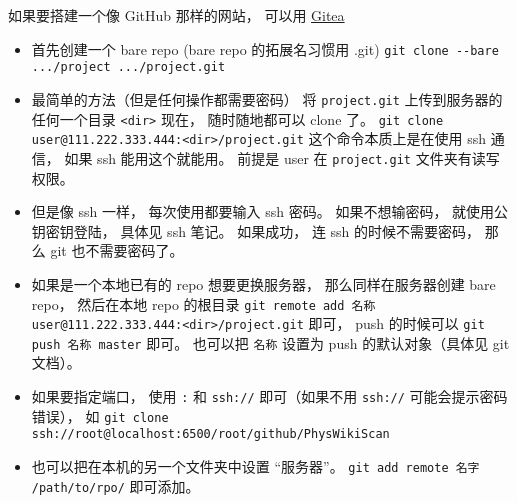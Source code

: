 
\begin{issues}
\issueDraft
\end{issues}


如果要搭建一个像 GitHub 那样的网站， 可以用 \href{https://github.com/go-gitea/gitea}{Gitea}

\begin{itemize}
\item 首先创建一个 bare repo (bare repo 的拓展名习惯用 .git)
\verb|git clone --bare .../project .../project.git|

\item 最简单的方法（但是任何操作都需要密码）
将 \verb|project.git| 上传到服务器的任何一个目录 \verb|<dir>|
现在， 随时随地都可以 clone 了。
\verb`git clone user@111.222.333.444:<dir>/project.git`
这个命令本质上是在使用 ssh 通信， 如果 ssh 能用这个就能用。
前提是 user 在 \verb|project.git| 文件夹有读写权限。

\item 但是像 ssh 一样， 每次使用都要输入 ssh 密码。 如果不想输密码， 就使用公钥密钥登陆， 具体见 ssh 笔记。 如果成功， 连 ssh 的时候不需要密码， 那么 git 也不需要密码了。

\item 如果是一个本地已有的 repo 想要更换服务器， 那么同样在服务器创建 bare repo， 然后在本地 repo 的根目录 \verb`git remote add 名称 user@111.222.333.444:<dir>/project.git` 即可， push 的时候可以 \verb`git push 名称 master` 即可。 也可以把 \verb`名称` 设置为 push 的默认对象（具体见 git 文档）。

\item 如果要指定端口， 使用 \verb`:` 和 \verb`ssh://` 即可（如果不用 \verb`ssh://` 可能会提示密码错误）， 如 \verb`git clone ssh://root@localhost:6500/root/github/PhysWikiScan`

\item 也可以把在本机的另一个文件夹中设置 “服务器”。 \verb|git add remote 名字 /path/to/rpo/| 即可添加。
\end{itemize}

